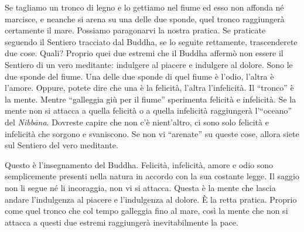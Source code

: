 Se tagliamo un tronco di legno e lo gettiamo nel fiume ed esso non
affonda né marcisce, e neanche si arena su una delle due sponde, quel
tronco raggiungerà certamente il mare. Possiamo paragonarvi la nostra
pratica. Se praticate seguendo il Sentiero tracciato dal Buddha, se lo
seguite rettamente, trascenderete due cose. Quali? Proprio quei due
estremi che il Buddha affermò non essere il Sentiero di un vero
meditante: indulgere al piacere e indulgere al dolore. Sono le due
sponde del fiume. Una delle due sponde di quel fiume è l'odio, l'altra è
l'amore. Oppure, potete dire che una è la felicità, l'altra
l'infelicità. Il ``tronco'' è la mente. Mentre ``galleggia giù per il
fiume'' sperimenta felicità e infelicità. Se la mente non si attacca a
quella felicità o a quella infelicità raggiungerà l'``oceano'' del
\emph{Nibbāna}. Dovreste capire che non c'è nient'altro, ci sono solo
felicità e infelicità che sorgono e svaniscono. Se non vi ``arenate'' su
queste cose, allora siete sul Sentiero del vero meditante.

Questo è l'insegnamento del Buddha. Felicità, infelicità, amore e odio
sono semplicemente presenti nella natura in accordo con la sua costante
legge. Il saggio non li segue né li incoraggia, non vi si attacca.
Questa è la mente che lascia andare l'indulgenza al piacere e
l'indulgenza al dolore. È la retta pratica. Proprio come quel tronco che
col tempo galleggia fino al mare, così la mente che non si attacca a
questi due estremi raggiungerà inevitabilmente la pace.

